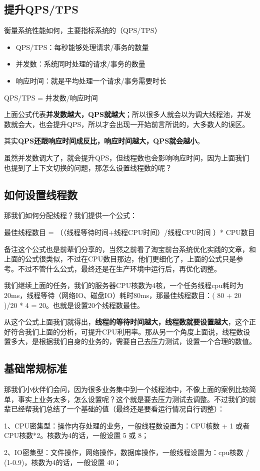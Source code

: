 \documentclass[12pt]{article}
\begin{document}
\subsection{提升QPS/TPS}
衡量系统性能如何，主要指标系统的（QPS/TPS）
\begin{itemize}
\setlength{\itemsep}{0pt}
\setlength{\parsep}{0pt}
\setlength{\parskip}{0pt}
    \item QPS/TPS：每秒能够处理请求/事务的数量
    \item 并发数：系统同时处理的请求/事务的数量
    \item 响应时间：就是平均处理一个请求/事务需要时长
\end{itemize}

QPS/TPS = 并发数/响应时间

上面公式代表\textbf{并发数越大，QPS就越大}；所以很多人就会以为调大线程池，并发数就会大，也会提升QPS，所以才会出现一开始前言所说的，大多数人的误区。

其实\textbf{QPS还跟响应时间成反比，响应时间越大，QPS就会越小}。

虽然并发数调大了，就会提升QPS，但线程数也会影响响应时间，因为上面我们也提到了上下文切换的问题，那怎么设置线程数的呢？

\subsection{如何设置线程数}
那我们如何分配线程？我们提供一个公式：

最佳线程数目 = （（线程等待时间+线程CPU时间）/线程CPU时间 ）* CPU数目

备注这个公式也是前辈们分享的，当然之前看了淘宝前台系统优化实践的文章，和上面的公式很类似，不过在CPU数目那边，他们更细化了，上面的公式只是参考。不过不管什么公式，最终还是在生产环境中运行后，再优化调整。

我们继续上面的任务，我们的服务器CPU核数为4核，一个任务线程cpu耗时为20ms，线程等待（网络IO、磁盘IO）耗时80ms，那最佳线程数目：( 80 + 20 )/20 * 4 = 20。也就是设置20个线程数最佳。

从这个公式上面我们就得出，\textbf{线程的等待时间越大，线程数就要设置越大}，这个正好符合我们上面的分析，可提升CPU利用率。那从另一个角度上面说，线程数设置多大，是根据我们自身的业务的，需要自己去压力测试，设置一个合理的数值。

\subsection{基础常规标准}
那我们小伙伴们会问，因为很多业务集中到一个线程池中，不像上面的案例比较简单，事实上业务太多，怎么设置呢？这个就是要去压力测试去调整。不过我们的前辈已经帮我们总结了一个基础的值（最终还是要看运行情况自行调整）：

1、CPU密集型：操作内存处理的业务，一般线程数设置为：CPU核数 + 1 或者 CPU核数*2。核数为4的话，一般设置 5 或 8；

2、IO密集型：文件操作，网络操作，数据库操作，一般线程设置为：cpu核数 / (1-0.9)，核数为4的话，一般设置 40；





\end{document}
